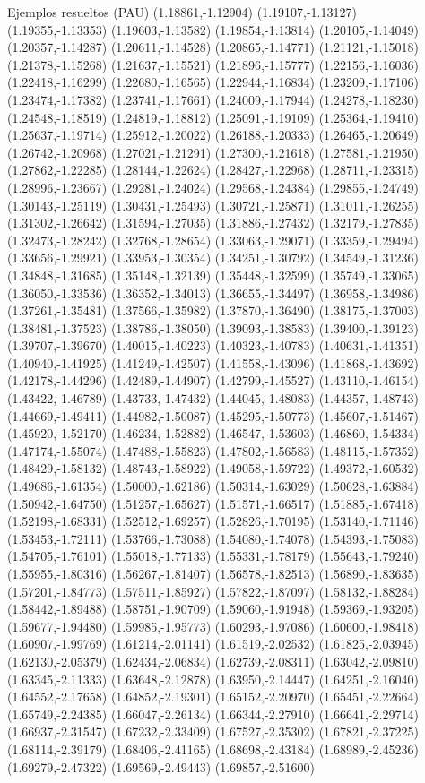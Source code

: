 \documentclass[11pt,a4paper]{article}
\begin{document}
\begin{fmex}{Ejemplos resueltos (PAU)}
(1.18861,-1.12904) (1.19107,-1.13127) (1.19355,-1.13353) (1.19603,-1.13582) (1.19854,-1.13814) (1.20105,-1.14049) (1.20357,-1.14287) (1.20611,-1.14528) (1.20865,-1.14771) (1.21121,-1.15018) (1.21378,-1.15268) (1.21637,-1.15521) (1.21896,-1.15777) (1.22156,-1.16036) (1.22418,-1.16299) (1.22680,-1.16565) (1.22944,-1.16834) (1.23209,-1.17106) (1.23474,-1.17382) (1.23741,-1.17661) (1.24009,-1.17944) (1.24278,-1.18230) (1.24548,-1.18519) (1.24819,-1.18812) (1.25091,-1.19109) (1.25364,-1.19410) (1.25637,-1.19714) (1.25912,-1.20022) (1.26188,-1.20333) (1.26465,-1.20649) (1.26742,-1.20968) (1.27021,-1.21291) (1.27300,-1.21618) (1.27581,-1.21950) (1.27862,-1.22285) (1.28144,-1.22624) (1.28427,-1.22968) (1.28711,-1.23315) (1.28996,-1.23667) (1.29281,-1.24024) (1.29568,-1.24384) (1.29855,-1.24749) (1.30143,-1.25119) (1.30431,-1.25493) (1.30721,-1.25871) (1.31011,-1.26255) (1.31302,-1.26642) (1.31594,-1.27035) (1.31886,-1.27432) (1.32179,-1.27835) (1.32473,-1.28242) (1.32768,-1.28654) (1.33063,-1.29071) (1.33359,-1.29494) (1.33656,-1.29921) (1.33953,-1.30354) (1.34251,-1.30792) (1.34549,-1.31236) (1.34848,-1.31685) (1.35148,-1.32139) (1.35448,-1.32599) (1.35749,-1.33065) (1.36050,-1.33536) (1.36352,-1.34013) (1.36655,-1.34497) (1.36958,-1.34986) (1.37261,-1.35481) (1.37566,-1.35982) (1.37870,-1.36490) (1.38175,-1.37003) (1.38481,-1.37523) (1.38786,-1.38050) (1.39093,-1.38583) (1.39400,-1.39123) (1.39707,-1.39670) (1.40015,-1.40223) (1.40323,-1.40783) (1.40631,-1.41351) (1.40940,-1.41925) (1.41249,-1.42507) (1.41558,-1.43096) (1.41868,-1.43692) (1.42178,-1.44296) (1.42489,-1.44907) (1.42799,-1.45527) (1.43110,-1.46154) (1.43422,-1.46789) (1.43733,-1.47432) (1.44045,-1.48083) (1.44357,-1.48743) (1.44669,-1.49411) (1.44982,-1.50087) (1.45295,-1.50773) (1.45607,-1.51467) (1.45920,-1.52170) (1.46234,-1.52882) (1.46547,-1.53603) (1.46860,-1.54334) (1.47174,-1.55074) (1.47488,-1.55823) (1.47802,-1.56583) (1.48115,-1.57352) (1.48429,-1.58132) (1.48743,-1.58922) (1.49058,-1.59722) (1.49372,-1.60532) (1.49686,-1.61354) (1.50000,-1.62186) (1.50314,-1.63029) (1.50628,-1.63884) (1.50942,-1.64750) (1.51257,-1.65627) (1.51571,-1.66517) (1.51885,-1.67418) (1.52198,-1.68331) (1.52512,-1.69257) (1.52826,-1.70195) (1.53140,-1.71146) (1.53453,-1.72111) (1.53766,-1.73088) (1.54080,-1.74078) (1.54393,-1.75083) (1.54705,-1.76101) (1.55018,-1.77133) (1.55331,-1.78179) (1.55643,-1.79240) (1.55955,-1.80316) (1.56267,-1.81407) (1.56578,-1.82513) (1.56890,-1.83635) (1.57201,-1.84773) (1.57511,-1.85927) (1.57822,-1.87097) (1.58132,-1.88284) (1.58442,-1.89488) (1.58751,-1.90709) (1.59060,-1.91948) (1.59369,-1.93205) (1.59677,-1.94480) (1.59985,-1.95773) (1.60293,-1.97086) (1.60600,-1.98418) (1.60907,-1.99769) (1.61214,-2.01141) (1.61519,-2.02532) (1.61825,-2.03945) (1.62130,-2.05379) (1.62434,-2.06834) (1.62739,-2.08311) (1.63042,-2.09810) (1.63345,-2.11333) (1.63648,-2.12878) (1.63950,-2.14447) (1.64251,-2.16040) (1.64552,-2.17658) (1.64852,-2.19301) (1.65152,-2.20970) (1.65451,-2.22664) (1.65749,-2.24385) (1.66047,-2.26134) (1.66344,-2.27910) (1.66641,-2.29714) (1.66937,-2.31547) (1.67232,-2.33409) (1.67527,-2.35302) (1.67821,-2.37225) (1.68114,-2.39179) (1.68406,-2.41165) (1.68698,-2.43184) (1.68989,-2.45236) (1.69279,-2.47322) (1.69569,-2.49443) (1.69857,-2.51600) 
\end{fmex}
\end{document}
